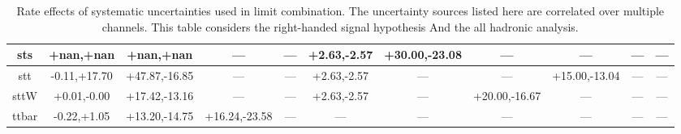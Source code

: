 \begin{table}
\begin{center}
\begin{small}
{\begin{tabular}{|c||cccccccccc|}
\hline 
sts & +nan,+nan & +nan,+nan & --- & --- & +2.63,-2.57 & +30.00,-23.08 & --- & --- & --- & ---\\ 
\hline 
stt & -0.11,+17.70 & +47.87,-16.85 & --- & --- & +2.63,-2.57 & --- & --- & +15.00,-13.04 & --- & ---\\ 
\hline 
sttW & +0.01,-0.00 & +17.42,-13.16 & --- & --- & +2.63,-2.57 & --- & +20.00,-16.67 & --- & --- & ---\\ 
\hline 
ttbar & -0.22,+1.05 & +13.20,-14.75 & +16.24,-23.58 & --- & --- & --- & --- & --- & --- & ---\\
\hline
\end{tabular}
}
\caption{Rate effects of systematic uncertainties used in limit combination.  The uncertainty sources listed here are correlated over multiple channels.  This table considers the right-handed signal hypothesis
And the all hadronic analysis.}
\label{table:bsRsysCoH}

\end{small}
\end{center}
\end{table}


